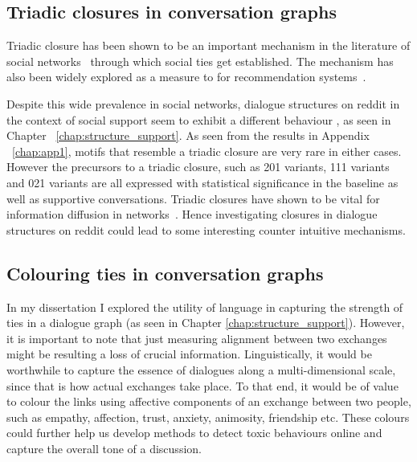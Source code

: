 \subsection{Triadic closures in conversation graphs}
Triadic closure has been shown to be an important mechanism in the literature of social networks~\cite{granovetter1977strength,mollenhorst2011shared} through which social ties get established. The mechanism has also been widely explored as a measure to for recommendation systems~\cite{sintos2014using,lou2013learning}.

Despite this wide prevalence in social networks, dialogue structures on reddit in the context of social support seem to exhibit a different behaviour , as seen in Chapter ~\ref{chap:structure_support}. As seen from the results in Appendix ~\ref{chap:app1}, motifs that resemble a triadic closure are very rare in either cases. However the precursors to a triadic closure, such as 201 variants, 111 variants and 021 variants are all expressed with statistical significance in the baseline as well as supportive conversations. Triadic closures have shown to be vital for information diffusion in networks~\cite{babaei2016efficiency}. Hence investigating closures in dialogue structures on reddit could lead to some interesting counter intuitive mechanisms.

\subsection{Colouring ties in conversation graphs}
In my dissertation I explored the utility of language in capturing the strength of ties in a dialogue graph (as seen in Chapter \ref{chap:structure_support}). However, it is important to note that just measuring alignment between two exchanges might be resulting a loss of crucial information. Linguistically, it would be worthwhile to capture the essence of dialogues along a multi-dimensional scale, since that is how actual exchanges take place. 
To that end, it would be of value to colour the links using affective components of an exchange between two people, such as empathy, affection, trust, anxiety, animosity, friendship etc. These colours could further help us develop methods to detect toxic behaviours online and capture the overall tone of a discussion. 

